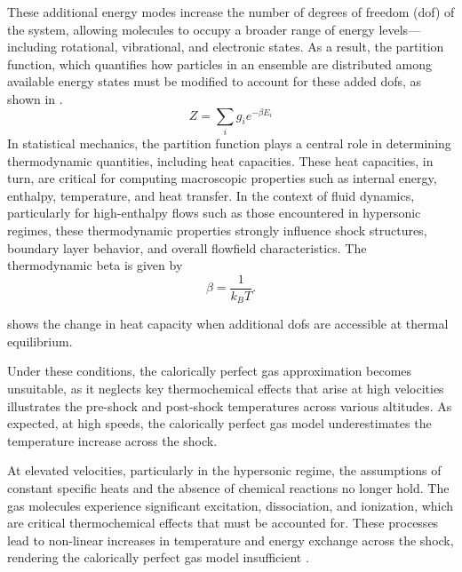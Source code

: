 These additional energy modes increase the number of degrees of freedom
(\gls{dof}) of the system, allowing molecules to occupy a broader range of
energy levels—including rotational, vibrational, and electronic states. As a
result, the partition function, which quantifies how particles in an ensemble
are distributed among available energy states \cite{Laurendeau2005} must be
modified to account for these added \glspl{dof}, as shown in
. 
        \begin{equation}\label{eq:partitionFunction} 
            Z = \sum_{i}g_ie^{-\beta E_i}
        \end{equation}
In statistical mechanics, the partition function
plays a central role in determining thermodynamic quantities, including heat
capacities. These heat capacities, in turn, are critical for computing
macroscopic properties such as internal energy, enthalpy, temperature, and heat
transfer. In the context of fluid dynamics, particularly for high-enthalpy
flows such as those encountered in hypersonic regimes, these thermodynamic
properties strongly influence shock structures, boundary layer behavior, and
overall flowfield characteristics. The thermodynamic beta is given by
        \begin{equation}\label{eq:thermodynamicBeta}
            \beta = \frac{1}{k_B T}.
        \end{equation}

         shows the change in heat capacity when
        additional \glspl{dof} are accessible at thermal equilibrium.

        Under these conditions, the calorically perfect gas approximation
        becomes unsuitable, as it neglects key thermochemical effects that
        arise at high velocities  illustrates
        the pre-shock and post-shock temperatures across various altitudes. As
        expected, at high speeds, the calorically perfect gas model
        underestimates the temperature increase across the shock.

        At elevated velocities, particularly in the hypersonic regime, the
        assumptions of constant specific heats and the absence of chemical
        reactions no longer hold. The gas molecules experience significant
        excitation, dissociation, and ionization, which are critical
        thermochemical effects that must be accounted for. These processes lead
        to non-linear increases in temperature and energy exchange across the
        shock, rendering the calorically perfect gas model
        insufficient \cite{Anderson2004}.  \\

